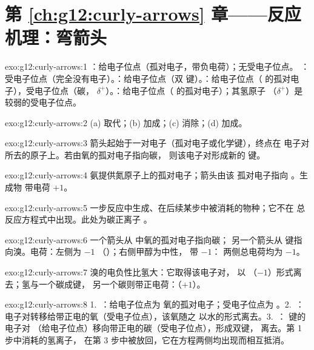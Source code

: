\section*{第 \ref{ch:g12:curly-arrows} 章——反应机理：弯箭头}

\begin{solution}{exo:g12:curly-arrows:1}
：给电子位点（孤对电子，带负电荷）；无受电子位点。
：受电子位点（完全没有电子）。：给电子位点（双
键）。：给电子位点（ 的孤对电子），受电子位点（碳，
$\delta^+$）。：给电子位点（ 的孤对电子）；其氢原子
（$\delta^+$）是较弱的受电子位点。
\end{solution}

\begin{solution}{exo:g12:curly-arrows:2}
(a) 取代；(b) 加成；(c) 消除；(d) 加成。
\end{solution}

\begin{solution}{exo:g12:curly-arrows:3}
箭头起始于一对电子（孤对电子或化学键），终点在
电子对所去的原子上。若由氧的孤对电子指向碳，
则该电子对形成新的  键。
\end{solution}

\begin{solution}{exo:g12:curly-arrows:4}
氨提供氮原子上的孤对电子；箭头由该
孤对电子指向 。生成物  带电荷 $+1$。
\end{solution}

\begin{solution}{exo:g12:curly-arrows:5}
一步反应中生成、在后续某步中被消耗的物种；它不在
总反应方程式中出现。此处为碳正离子 。
\end{solution}

\begin{solution}{exo:g12:curly-arrows:6}
一个箭头从  中氧的孤对电子指向碳；
另一个箭头从  键指向溴。电荷：左侧为 $-1$
（）；右侧甲醇为中性， 带 $-1$：
两侧总电荷均为 $-1$。
\end{solution}

\begin{solution}{exo:g12:curly-arrows:7}
溴的电负性比氢大：它取得该电子对，
以 （$-1$）形式离去；氢与一个碳成键，
另一个碳则带正电荷：（$+1$）。
\end{solution}

\begin{solution}{exo:g12:curly-arrows:8}
1.~：给电子位点为
氧的孤对电子；受电子位点为 。2.~：
 电子对转移给带正电的氧（受电子位点），该氧随之
以水的形式离去。3.~： 键的电子对
（给电子位点）移向带正电的碳（受电子位点），形成双键，
 离去。第 1 步中消耗的氢离子，
在第 3 步中被放回，它在方程两侧均出现而相互抵消。
\end{solution}

